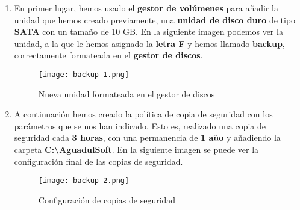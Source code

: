 \begin{enumerate}
    \item En primer lugar, hemos usado el \textbf{gestor de volúmenes} para añadir la unidad que hemos creado previamente, una \textbf{unidad de disco duro} de tipo \textbf{SATA} con un tamaño de 10 GB.  En la siguiente imagen podemos ver la unidad, a la que le hemos asignado la \textbf{letra F} y hemos llamado \textbf{backup}, correctamente formateada en el \textbf{gestor de discos}.

    \begin{figure}[H]
        \centering
        \texttt{[image: backup-1.png]}
        \caption{Nueva unidad formateada en el gestor de discos}
    \end{figure}

    \item A continuación hemos creado la política de copia de seguridad con los parámetros que se nos han indicado. Esto es, realizado una copia de seguridad cada \textbf{3 horas}, con una permanencia de \textbf{1 año} y añadiendo la carpeta \textbf{C:\textbackslash AguadulSoft}. En la siguiente imagen se puede ver la configuración final de las copias de seguridad.

    \begin{figure}[H]
        \centering
        \texttt{[image: backup-2.png]}
        \caption{Configuración de copias de seguridad}
    \end{figure}
\end{enumerate}





%
%

